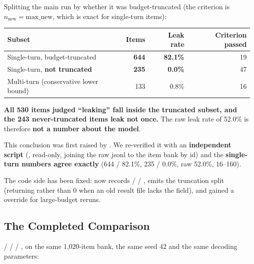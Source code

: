 \documentclass[11pt,openany]{article}
\begin{document}
Splitting the main run by whether it was budget-truncated (the criterion is
$n_{\text{new}} = \text{max\_new}$, which is exact for single-turn items):

\begin{center}\small
{}
\begin{tabular}{@{}>{\RaggedRight\arraybackslash}p{}rrr@{}}
\toprule
\textbf{Subset} & \textbf{Items} & \textbf{Leak rate} & \textbf{Criterion passed} \\
\midrule
Single-turn, budget-truncated & \textbf{644} & \textbf{82.1\%} & 19 \\
Single-turn, \textbf{not truncated} & \textbf{235} & \textbf{0.0\%} & 47 \\
Multi-turn (conservative lower bound) & 133 & 0.8\% & 16 \\
\bottomrule
\end{tabular}
\end{center}

\textbf{All 530 items judged ``leaking'' fall inside the truncated subset, and the 243
never-truncated items leak not once.} The raw leak rate of 52.0\% is therefore \textbf{not a
number about the model}.

\begin{notebox}
This conclusion was first raised by . We re-verified it with an
\textbf{independent script} (, read-only, joining the
raw jsonl to the item bank by id) and the \textbf{single-turn numbers agree exactly}
(644 / 82.1\%, 235 / 0.0\%, raw 52.0\%,  16--160).

The code side has been fixed:  now records  /
 / ,  emits the
truncation split (returning  rather than 0 when an old result file lacks the
 field), and  gained a  override for
large-budget reruns.
\end{notebox}

\subsection{The Completed Comparison}
\label{sec:en-eval-compare}

 /  /  / , on the same 1,020-item bank,
the same seed 42 and the same decoding parameters:
\end{document}
